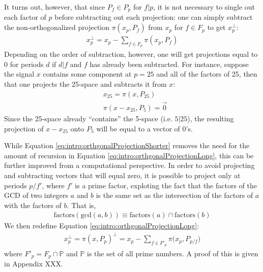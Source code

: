     It turns out, however, that since $P_f \in P_p$ for $f|p$, it is not necessary to single out each factor of $p$ before subtracting out each projection: one can simply subtract the non-orthogonalized projection $\pi(x_p, P_f)$ from $x_p$ for $f \in F_p$ to get $x_p^\perp$:
    \begin{align}\label{eq:intro:orthgonalProjectionShorter}
        x_{p}^{\perp} = x_p - \sum_{f \in F_p} \pi(x_p, P_f)
    \end{align}
    Depending on the order of subtraction, however, one will get projections equal to 0 for periods $d$ if $d|f$ and $f$ has already been subtracted. For instance, suppose the signal $x$ contains some component at $p = 25$ and all of the factors of 25, then that one projects the 25-space and subtracts it from $x$:
    \begin{align*}
        &x_{25} = \pi(x, P_{25}) \\
        &\pi(x - x_{25}, P_5) = \overrightarrow{0}
    \end{align*}
    Since the 25-space already ``contains'' the 5-space (i.e. $5|25$), the resulting projection of $x - x_{25}$ onto $P_{5}$ will be equal to a vector of 0's.

    While Equation \eqref{eq:intro:orthgonalProjectionShorter} removes the need for the amount of recursion in Equation \eqref{eq:intro:orthgonalProjectionLong}, this can be further improved from a computational perspective. In order to avoid projecting and subtracting vectors that will equal zero, it is possible to project only at periods $p/f'$, where $f'$ is a prime factor, exploting the fact that the factors of the GCD of two integers $a$ and $b$ is the same set as the intersection of the factors of $a$ with the factors of $b$. That is,
    \begin{align}\label{eq:intro:factorsGCDFactorsIntersect}
        \text{factors}(\text{gcd}(a, b)) \equiv \text{factors}(a) \cap \text{factors}(b)
    \end{align}
    We then redefine Equation \eqref{eq:intro:orthgonalProjectionLong}:
    \begin{align}\label{eq:intro:orthgonalProjection}
        x_{p}^{\perp} = \pi(x, P_p)^\perp = x_p - \sum_{f \in F'_p} \pi \bigg( x_p, P_{p/f} \bigg)
    \end{align}
    where $F'_p = F_p \cap \mathbb{P}$ and $\mathbb{P}$ is the set of all prime numbers. A proof of this is given in Appendix XXX.

